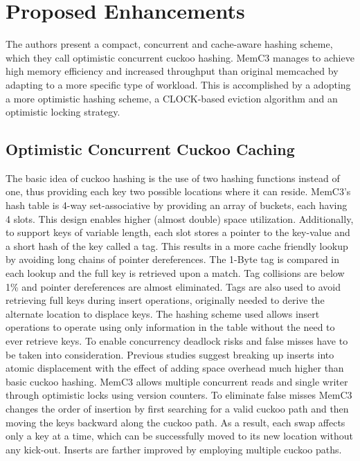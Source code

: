 \documentclass[letterpaper,twocolumn,10pt]{article}
\begin{document}
\section{Proposed Enhancements}

The authors present a compact, concurrent and cache-aware hashing scheme, which they call optimistic concurrent cuckoo hashing. MemC3 manages to achieve high memory efficiency and increased throughput than original memcached by adapting to a more specific type of workload. This is accomplished by a adopting a more optimistic hashing scheme, a CLOCK-based eviction algorithm and an optimistic locking strategy.

\subsection{Optimistic Concurrent Cuckoo Caching}
The basic idea of cuckoo hashing is the use of two hashing functions instead of one, thus providing each key two possible locations where it can reside. MemC3's hash table is 4-way set-associative by providing an array of buckets, each having 4 slots. This design enables higher (almost double) space utilization. 
Additionally, to support keys of variable length, each slot stores a pointer to the key-value and a short hash of the key called a tag. This results in a more cache friendly  lookup by avoiding long chains of pointer dereferences. The 1-Byte tag is compared in each lookup and the full key is retrieved upon a match. Tag collisions are below 1\% and pointer dereferences are almost eliminated.
Tags are also used to avoid retrieving full keys during insert operations, originally needed to derive the alternate location to displace keys. The hashing scheme used allows insert operations to operate using only information in the table without the need to ever retrieve keys.
To enable concurrency deadlock risks and false misses have to be taken into consideration.
Previous studies suggest breaking up inserts into atomic displacement with the effect of adding space overhead much higher than basic cuckoo hashing. MemC3 allows multiple concurrent reads and single writer through optimistic locks using version counters.
To eliminate false misses MemC3 changes the order of insertion by first searching for a valid cuckoo path and then moving the keys backward along the cuckoo path. As a result, each swap affects only a key at a time, which can be successfully moved to its new location without any kick-out. Inserts are farther improved by employing multiple cuckoo paths. 
\end{document}
